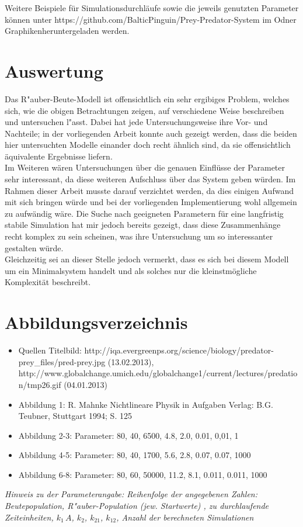 \documentclass[11pt]{article}
\begin{document}
\hspace{5mm}

Weitere Beispiele für Simulationsdurchläufe sowie die jeweils genutzten Parameter können unter https://github.com/BalticPinguin/Prey-Predator-System im Odner \glqq Graphiken\grqq  heruntergeladen werden.

\section{Auswertung}
Das R"auber-Beute-Modell ist offensichtlich ein sehr ergibiges Problem, welches sich, wie die obigen Betrachtungen zeigen, auf verschiedene Weise beschreiben und untersuchen l"asst. Dabei hat jede Untersuchungsweise ihre Vor- und Nachteile; in der vorliegenden Arbeit konnte auch gezeigt werden, dass die beiden hier untersuchten Modelle einander doch recht ähnlich sind, da sie offensichtlich äquivalente Ergebnisse liefern. \\
Im Weiteren wären Untersuchungen über die genauen Einflüsse der Parameter sehr interessant, da diese weiteren Aufschluss über das System geben würden. Im Rahmen dieser Arbeit musste darauf verzichtet werden, da dies einigen Aufwand mit sich bringen würde und bei der vorliegenden Implementierung wohl allgemein zu aufwändig wäre. Die Suche nach geeigneten Parametern für eine langfristig stabile Simulation hat mir jedoch bereits gezeigt, dass diese Zusammenhänge recht komplex zu sein scheinen, was ihre Untersuchung um so interessanter gestalten würde.\\
Gleichzeitig sei an dieser Stelle jedoch vermerkt, dass es sich bei diesem Modell um ein Minimalsystem handelt und als solches nur die kleinstmögliche Komplexität beschreibt.

\section{Abbildungsverzeichnis}
\begin{itemize}
   \item Quellen Titelbild: http://iqa.evergreenps.org/science/biology/predator-prey\_files/pred-prey.jpg (13.02.2013),\\
        http://www.globalchange.umich.edu/globalchange1/current/lectures/predation/tmp26.gif (04.01.2013)
   \item Abbildung 1: R. Mahnke \glqq Nichtlineare Physik in Aufgaben \grqq Verlag: B.G. Teubner, Stuttgart 1994; S. 125
   \item Abbildung 2-3: Parameter: 80, 40, 6500, 4.8, 2.0, 0.01, 0,01, 1
   \item Abbildung 4-5: Parameter: 80, 40, 1700, 5.6, 2.8, 0.07, 0.07, 1000
   \item Abbildung 6-8: Parameter: 80, 60, 50000, 11.2, 8.1, 0.011, 0.011, 1000
\end{itemize}
\textit{Hinweis zu der Parameterangabe: Reihenfolge der angegebenen Zahlen:\\
 Beutepopulation, R"auber-Population (jew. Startwerte) , zu durchlaufende Zeiteinheiten, $k_1\,A$, $k_2$, $k_{21}$, $k_{12}$, Anzahl der berechneten Simulationen}
\end{document}
